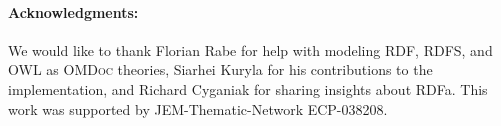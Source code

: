 \documentclass{llncs}
\renewcommand{\omdoc}{\textsc{OMDoc}\xspace}
\begin{document}
\fi

\paragraph{Acknowledgments:} We would like to thank Florian Rabe for help with modeling
RDF, RDFS, and OWL as \omdoc theories, Siarhei Kuryla for his contributions to the
implementation, and Richard Cyganiak for sharing insights about RDFa.  This work was
supported by JEM-Thematic-Network ECP-038208.

% 


\ifpublic


\else 


\fi
\end{document}
